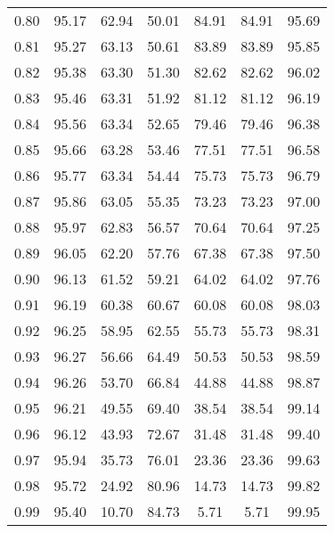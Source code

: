 \begin{tabular}{|c|c|c|c|c|c|c|}
      0.80 &     95.17 &     62.94 &      50.01 &   84.91 &      84.91 &         95.69 \\
      0.81 &     95.27 &     63.13 &      50.61 &   83.89 &      83.89 &         95.85 \\
      0.82 &     95.38 &     63.30 &      51.30 &   82.62 &      82.62 &         96.02 \\
      0.83 &     95.46 &     63.31 &      51.92 &   81.12 &      81.12 &         96.19 \\
      0.84 &     95.56 &     63.34 &      52.65 &   79.46 &      79.46 &         96.38 \\
      0.85 &     95.66 &     63.28 &      53.46 &   77.51 &      77.51 &         96.58 \\
      0.86 &     95.77 &     63.34 &      54.44 &   75.73 &      75.73 &         96.79 \\
      0.87 &     95.86 &     63.05 &      55.35 &   73.23 &      73.23 &         97.00 \\
      0.88 &     95.97 &     62.83 &      56.57 &   70.64 &      70.64 &         97.25 \\
      0.89 &     96.05 &     62.20 &      57.76 &   67.38 &      67.38 &         97.50 \\
      0.90 &     96.13 &     61.52 &      59.21 &   64.02 &      64.02 &         97.76 \\
      0.91 &     96.19 &     60.38 &      60.67 &   60.08 &      60.08 &         98.03 \\
      0.92 &     96.25 &     58.95 &      62.55 &   55.73 &      55.73 &         98.31 \\
      0.93 &     96.27 &     56.66 &      64.49 &   50.53 &      50.53 &         98.59 \\
      0.94 &     96.26 &     53.70 &      66.84 &   44.88 &      44.88 &         98.87 \\
      0.95 &     96.21 &     49.55 &      69.40 &   38.54 &      38.54 &         99.14 \\
      0.96 &     96.12 &     43.93 &      72.67 &   31.48 &      31.48 &         99.40 \\
      0.97 &     95.94 &     35.73 &      76.01 &   23.36 &      23.36 &         99.63 \\
      0.98 &     95.72 &     24.92 &      80.96 &   14.73 &      14.73 &         99.82 \\
      0.99 &     95.40 &     10.70 &      84.73 &    5.71 &       5.71 &         99.95 \\
\bottomrule
\end{tabular}
